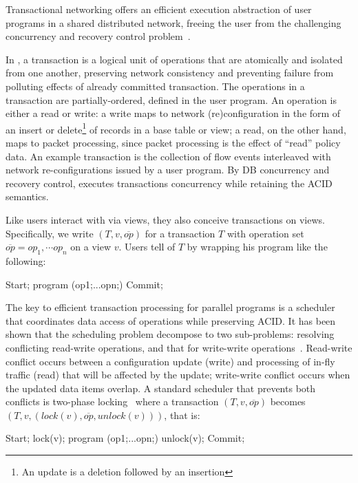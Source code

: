 Transactional networking offers an efficient execution abstraction of
user programs in a shared distributed network, freeing the user from
the challenging concurrency and recovery control
problem~\cite{consistency-lock,concurrency-recovery-alg,principles-tp,concurrency-ddb,Tc-ddb,crdb}.

 In \Sys, a
transaction is a logical unit of operations that are atomically and
isolated from one another, preserving network consistency and
preventing failure from polluting effects of already committed
transaction. The operations in a transaction are partially-ordered,
defined in the user program. An operation is either a read or write: a
write maps to network (re)configuration in the form of an insert or
delete\footnote{An update is a deletion followed by an insertion} of
records in a base table or view; a read, on the other hand, maps to
packet processing, since packet processing is the effect of ``read''
policy data. An example transaction is the collection of flow events
interleaved with network re-configurations issued by a user
program. By DB concurrency and recovery control, \Sys executes
transactions concurrency while retaining the ACID semantics.

Like users interact with \Sys via views, they also conceive
transactions on views. Specifically, we write $(T,v, \overline{op})$
for a transaction $T$ with operation set $\overline{op}=op_1,\cdots
op_n$ on a view $v$.  Users tell \Sys of $T$ by wrapping his program
like the following:
\begin{sql}
Start; program (op1;...opn;) Commit;
\end{sql}
The key to efficient transaction processing for parallel programs is a
scheduler that coordinates data access of operations while preserving
ACID. It has been shown that the scheduling problem decompose to two
sub-problems: resolving conflicting read-write operations, and that
for write-write operations~\cite{Bernstein:concurrency-recovery}.
Read-write conflict occurs between a configuration update (write) and
processing of in-fly traffic (read) that will be affected by the
update; write-write conflict occurs when the updated data items
overlap. A standard scheduler that prevents both conflicts is
two-phase locking~\cite{Bernstein:concurrency-recovery} where a
transaction $(T,v,\overline{op})$ becomes $(T,v, (lock(v),
\overline{op}, unlock(v)))$, that is:
\begin{sql}
Start; lock(v); program (op1;...opn;) unlock(v); Commit;
\end{sql}

